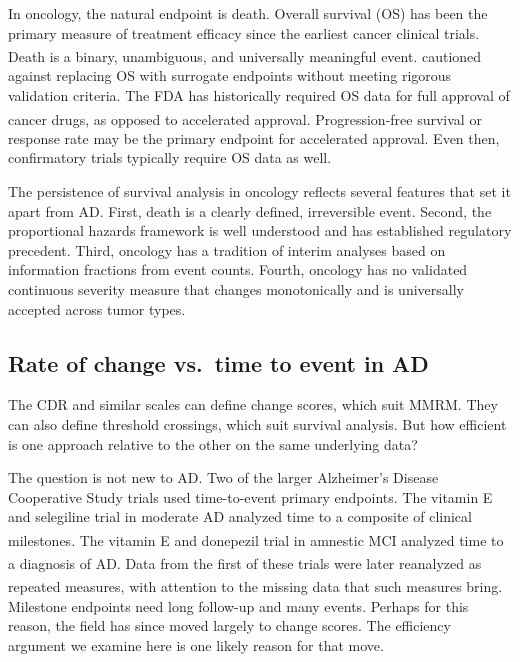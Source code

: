 \documentclass[
  11pt,
]{article}
\begin{document}
In oncology, the natural endpoint is death. Overall
survival (OS) has been the primary measure of treatment
efficacy since the earliest cancer clinical trials. Death
is a binary, unambiguous, and universally meaningful
event.\textsuperscript{} cautioned against replacing OS with
surrogate endpoints without meeting rigorous validation
criteria. The FDA has historically required OS data for
full approval of cancer drugs, as opposed to accelerated
approval\textsuperscript{}. Progression-free survival or
response rate may be the primary endpoint for accelerated
approval. Even then, confirmatory trials typically require
OS data as well.

The persistence of survival analysis in oncology reflects
several features that set it apart from AD. First, death
is a clearly defined, irreversible event. Second, the
proportional hazards framework is well understood and has
established regulatory precedent. Third, oncology has a
tradition of interim analyses based on information
fractions from event counts. Fourth, oncology has no
validated continuous severity measure that changes
monotonically and is universally accepted across tumor
types.

\subsection{Rate of change vs.~time to event in AD}\label{rate-of-change-vs.-time-to-event-in-ad}

The CDR and similar scales can define change scores, which
suit MMRM. They can also define threshold crossings, which
suit survival analysis. But how efficient is one approach
relative to the other on the same underlying data?

The question is not new to AD. Two of the larger
Alzheimer's Disease Cooperative Study trials used
time-to-event primary endpoints. The vitamin E and
selegiline trial in moderate AD analyzed time to a
composite of clinical milestones\textsuperscript{}.
The vitamin E and donepezil trial in amnestic MCI analyzed
time to a diagnosis of AD\textsuperscript{}. Data
from the first of these trials were later reanalyzed as
repeated measures, with attention to the missing data that
such measures bring\textsuperscript{}. Milestone
endpoints need long follow-up and many events. Perhaps for
this reason, the field has since moved largely to change
scores. The efficiency argument we examine here is one
likely reason for that move.
\end{document}

